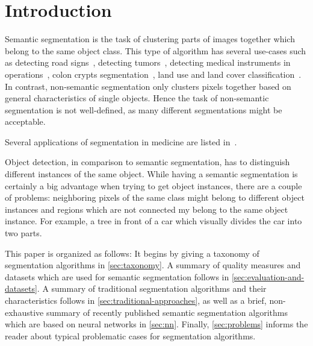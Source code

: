 
\section{Introduction}\label{sec:introduction}
Semantic segmentation is the task of clustering parts of images together which
belong to the same object class. This type of algorithm has several use-cases
such as detecting road signs~\cite{4220659}, detecting
tumors~\cite{moon2002automatic}, detecting medical instruments in
operations~\cite{wei1997automatic}, colon crypts
segmentation~\cite{cohen2015memory}, land use and land cover
classification~\cite{huang2002assessment}. In contrast, non-semantic
segmentation only clusters pixels together based on general characteristics of
single objects. Hence the task of non-semantic segmentation is not
well-defined, as many different segmentations might be acceptable.

Several applications of segmentation in medicine are listed
in~\cite{annurev.bioeng.2.1.315}.

Object detection, in comparison to semantic segmentation, has to distinguish
different instances of the same object. While having a semantic segmentation is
certainly a big advantage when trying to get object instances, there are a
couple of problems: neighboring pixels of the same class might belong to
different object instances and regions which are not connected my belong to the
same object instance. For example, a tree in front of a car which visually
divides the car into two parts.

This paper is organized as follows: It begins by giving a taxonomy of
segmentation algorithms in \cref{sec:taxonomy}. A summary of quality measures
and datasets which are used for semantic segmentation follows in
\cref{sec:evaluation-and-datasets}. A summary of traditional
segmentation algorithms and their characteristics follows in
\cref{sec:traditional-approaches}, as well as a brief, non-exhaustive
summary of recently published semantic segmentation algorithms which are based
on neural networks in \cref{sec:nn}. Finally, \cref{sec:problems} informs the
reader about typical problematic cases for segmentation algorithms.
